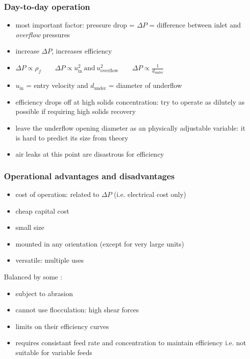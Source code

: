 \begin{frame}\frametitle{Day-to-day operation}
	\begin{itemize}
		\item	most important factor: pressure drop = $\Delta P$ = difference between inlet and \emph{overflow} pressures
		\item	increase $\Delta P$, increases efficiency
		\item	$\Delta P \propto \rho_f \qquad  \Delta P \propto u_\text{in}^2~\text{and}~u_\text{overflow}^2 \qquad  \Delta P \propto \displaystyle\frac{1}{d_\text{under}}$
		\item	$u_\text{in}$ = entry velocity and $d_\text{under}$ = diameter of underflow
		\item	efficiency drops off at high solids concentration: try to operate as dilutely as possible if requiring high solids recovery
		\item	leave the underflow opening diameter as an physically adjustable variable: it is hard to predict its size from theory
		\item	air leaks at this point are disastrous for efficiency 
	\end{itemize}
\end{frame}

\begin{frame}\frametitle{Operational advantages and disadvantages}
	{\color{myGreen}{Advantages}}
	\begin{itemize}
		\item	cost of operation: related to $\Delta P$ (i.e. electrical cost only)
		\item	cheap capital cost
		\item	small size
		\item	mounted in any orientation (except for very large units)
		\item	versatile: multiple uses
	\end{itemize}
	
	
	Balanced by some {\color{myOrange}{disadvantages}}:
	\begin{itemize}
		\item	subject to abrasion
		\item	cannot use flocculation: high shear forces
		\item	limits on their efficiency curves
		\item	requires consistant feed rate and concentration to maintain efficiency i.e. not suitable for variable feeds
	\end{itemize}	
\end{frame}


